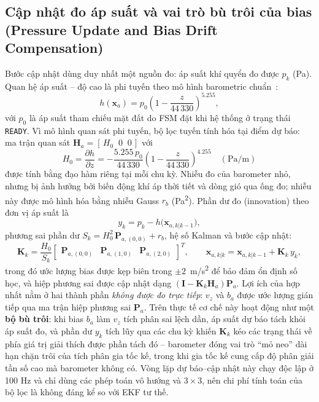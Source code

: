\subsection{Cập nhật đo áp suất và vai trò bù trôi của bias (Pressure Update and Bias Drift Compensation)}

Bước cập nhật dùng duy nhất một nguồn đo: áp suất khí quyển đo được $p_k$ (Pa). Quan hệ áp suất -- độ cao là phi tuyến theo mô hình barometric chuẩn~\cite{bmp180}:
\begin{equation}
h(\mathbf{x}_a) = p_0 \left(1 - \dfrac{z}{44\,330}\right)^{5.255},
\end{equation}
với $p_0$ là áp suất tham chiếu mặt đất do FSM đặt khi hệ thống ở trạng thái \texttt{READY}. Vì mô hình quan sát phi tuyến, bộ lọc tuyến tính hóa tại điểm dự báo: ma trận quan sát $\mathbf{H}_a = \left[\,H_0 \;\; 0 \;\; 0\,\right]$ với
\begin{equation}
H_0 = \dfrac{\partial h}{\partial z} = -\dfrac{5.255\, p_0}{44\,330} \left(1 - \dfrac{z}{44\,330}\right)^{4.255} \quad (\text{Pa/m})
\end{equation}
được tính bằng đạo hàm riêng tại mỗi chu kỳ. Nhiễu đo của barometer nhỏ, nhưng bị ảnh hưởng bởi biến động khí áp thời tiết và dòng gió qua ống đo; nhiễu này được mô hình hóa bằng nhiễu Gauss $r_b$ (Pa\textsuperscript{2}). Phần dư đo (innovation) theo đơn vị áp suất là
\begin{equation}
y_k = p_k - h\bigl(\mathbf{x}_{a,k|k-1}\bigr),
\end{equation}
phương sai phần dư $S_k = H_0^{2}\, \mathbf{P}_{a,(0,0)} + r_b$, hệ số Kalman và bước cập nhật:
\begin{equation}
\mathbf{K}_k = \dfrac{H_0}{S_k}
\begin{bmatrix} \mathbf{P}_{a,(0,0)} & \mathbf{P}_{a,(1,0)} & \mathbf{P}_{a,(2,0)} \end{bmatrix}^{T},
\qquad
\mathbf{x}_{a,k|k} = \mathbf{x}_{a,k|k-1} + \mathbf{K}_k\, y_k,
\end{equation}
trong đó ước lượng bias được kẹp biên trong $\pm 2$~m/s\textsuperscript{2} để bảo đảm ổn định số học, và hiệp phương sai được cập nhật dạng $(\mathbf{I} - \mathbf{K}_k \mathbf{H}_a)\mathbf{P}_a$. Lợi ích của hợp nhất nằm ở hai thành phần \textit{không được đo trực tiếp}: $v_z$ và $b_a$ được ước lượng gián tiếp qua ma trận hiệp phương sai $\mathbf{P}_a$. Trên thực tế cơ chế này hoạt động như một \textbf{bộ bù trôi}: khi bias $b_a$ làm $v_z$ tích phân sai lệch dần, áp suất dự báo tách khỏi áp suất đo, và phần dư $y_k$ tích lũy qua các chu kỳ khiến $\mathbf{K}_k$ kéo các trạng thái về phía giá trị giải thích được phần tách đó -- barometer đóng vai trò ``mỏ neo'' dài hạn chặn trôi của tích phân gia tốc kế, trong khi gia tốc kế cung cấp độ phân giải tần số cao mà barometer không có. Vòng lặp dự báo--cập nhật này chạy độc lập ở 100 Hz và chỉ dùng các phép toán vô hướng và $3\times 3$, nên chi phí tính toán của bộ lọc là không đáng kể so với EKF tư thế.

